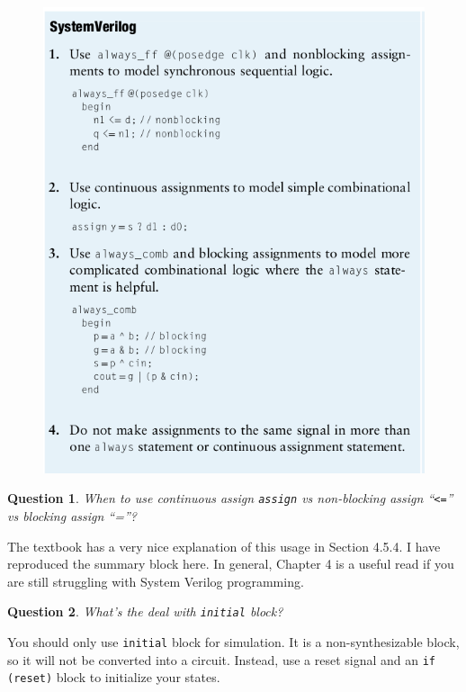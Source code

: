 \documentclass{article}
\newtheorem{question}{Question}
\begin{document}
\begin{figure}
  \includegraphics[width=\linewidth]{./blocking-vs-non-blocking-assignment.png}
\end{figure}


\begin{question}
  When to use continuous assign \lstinline[style=verilog-style]{assign} vs non-blocking assign ``\lstinline{<=}'' vs
  blocking assign ``=''? 
\end{question}
The textbook has a very nice explanation of this usage
in Section 4.5.4. I have reproduced the summary block here. In general, Chapter 4 is a useful read if you are
still struggling with System Verilog programming.

\begin{question}
  What's the deal with \lstinline[style=verilog-style]{initial} block?
\end{question}
You should only use \lstinline[style=verilog-style]{initial} block for
simulation. It is a non-synthesizable block, so it will not be converted into a
circuit. Instead, use a reset signal and an \lstinline[style=verilog-style]{if (reset)}
block to initialize your states.
\end{document}
